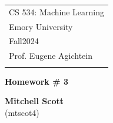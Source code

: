 \documentclass[a4paper,12pt]{article}
\theoremstyle{definition}
\theoremstyle{remark}
\begin{document}
	
	
	
	
	
	\thispagestyle{empty} %
	
	\begin{tabular}{p{15.5cm}} %
		{\large \sc CS 534:  Machine Learning} \\
		Emory University \\ Fall2024 \\ Prof. Eugene Agichtein \\
		\hline %
		\\
	\end{tabular} %
	
	\vspace*{0.3cm} %
	
	\begin{center} %
		{\Large \bf Homework \# 3} %
		\vspace{2mm}
		
		{\bf Mitchell Scott}\\ (mtscot4) %
		
	\end{center}  
	
	\vspace{0.4cm}
	
	
	
\end{document}
